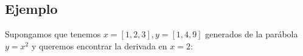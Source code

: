 \documentclass[xcolor=svgnames]{beamer} %
\theoremstyle{plain}
\theoremstyle{definition}
\begin{document}
\subsection{Ejemplo}

\begin{frame}
  Supongamos que tenemos $x = [1,2,3], y=[1,4,9]$ generados de la parábola
$y= x^2$ y queremos encontrar la derivada en $x=2$:

  \begin{minipage}{.55\linewidth}

\end{minipage}
\end{frame}
\end{document}
